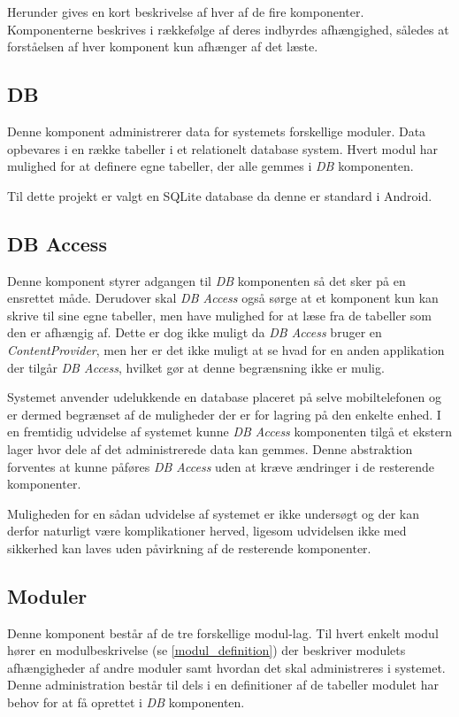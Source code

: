 Herunder gives en kort beskrivelse af hver af de fire komponenter.
Komponenterne beskrives i rækkefølge af deres indbyrdes afhængighed, således at forståelsen af hver komponent kun afhænger af det læste.

\subsection*{DB}
Denne komponent administrerer data for systemets forskellige moduler.
Data opbevares i en række tabeller i et relationelt database system.
Hvert modul har mulighed for at definere egne tabeller, der alle gemmes i \textit{DB} komponenten.

Til dette projekt er valgt en SQLite database da denne er standard i Android.

\subsection*{DB Access}
Denne komponent styrer adgangen til \textit{DB} komponenten så det sker på en ensrettet måde.
Derudover skal \textit{DB Access} også sørge at et komponent kun kan skrive til sine egne tabeller, men have mulighed for at læse fra de tabeller som den er afhængig af.
Dette er dog ikke muligt da \textit{DB Access} bruger en \textit{ContentProvider}, men her er det ikke muligt at se hvad for en anden applikation der tilgår \textit{DB Access}, hvilket gør at denne begrænsning ikke er mulig. 

Systemet anvender udelukkende en database placeret på selve mobiltelefonen og er dermed begrænset af de muligheder der er for lagring på den enkelte enhed.
I en fremtidig udvidelse af systemet kunne \textit{DB Access} komponenten tilgå et ekstern lager hvor dele af det administrerede data kan gemmes.
Denne abstraktion forventes at kunne påføres \textit{DB Access} uden at kræve ændringer i de resterende komponenter.

Muligheden for en sådan udvidelse af systemet er ikke undersøgt og der kan derfor naturligt være komplikationer herved, ligesom udvidelsen ikke med sikkerhed kan laves uden påvirkning af de resterende komponenter.

\subsection*{Moduler}
Denne komponent består af de tre forskellige modul-lag.
Til hvert enkelt modul hører en modulbeskrivelse (se \cref{modul_definition}) der beskriver modulets afhængigheder af andre moduler samt hvordan det skal administreres i systemet.
Denne administration består til dels i en definitioner af de tabeller modulet har behov for at få oprettet i \textit{DB} komponenten.

